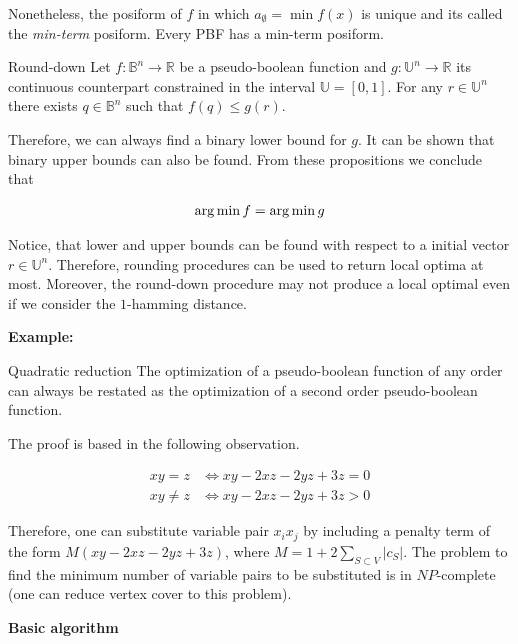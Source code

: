 Nonetheless, the posiform of $f$ in which $a_{\emptyset} = \min{f(x)}$ is unique and its called the \emph{min-term} posiform. Every PBF has a min-term posiform.

\begin{proposition}{Round-down}\label{prop:round-down}
Let $f:\mathbb{B}^n \rightarrow \mathbb{R}$ be a pseudo-boolean function and $g:\mathbb{U}^n\rightarrow \mathbb{R}$ its continuous counterpart constrained in the interval $\mathbb{U} = [0,1]$. For any $r \in \mathbb{U}^n$ there exists $q \in \mathbb{B}^n$ such that $f(q) \leq g(r)$.
\end{proposition}

Therefore, we can always find a binary lower bound for $g$. It can be shown that binary upper bounds can also be found. From these propositions we conclude that

\begin{align*}
	\operatorname*{arg\,min}{f} = \operatorname*{arg\,min}{g}
\end{align*}

Notice,  that lower and upper bounds can be found with respect to a initial vector $r \in \mathbb{U}^n$. Therefore, rounding procedures can be used to return local optima at most. Moreover, the round-down procedure may not produce a local optimal even if we consider the $1$-hamming distance.

\textbf{Example:}

\begin{proposition}{Quadratic reduction}\label{prop:quadratic-reduction}
	The optimization of a pseudo-boolean function of any order can always be restated as the optimization of a second order pseudo-boolean function.
\end{proposition} 

The proof is based in the following observation.

\begin{align*}
	xy = z &\Leftrightarrow xy - 2xz -2yz + 3z = 0 \\
	xy \neq z &\Leftrightarrow xy -2xz - 2yz + 3z > 0	
\end{align*}

Therefore, one can substitute variable pair $x_ix_j$ by including a penalty term of the form $M(xy - 2xz -2yz + 3z)$, where $M=1 + 2\sum_{S \subset V}{|c_S|}$. The problem to find the minimum number of variable pairs to be substituted is in $NP$-complete (one can reduce vertex cover to this problem).


\textbf{Basic algorithm}

